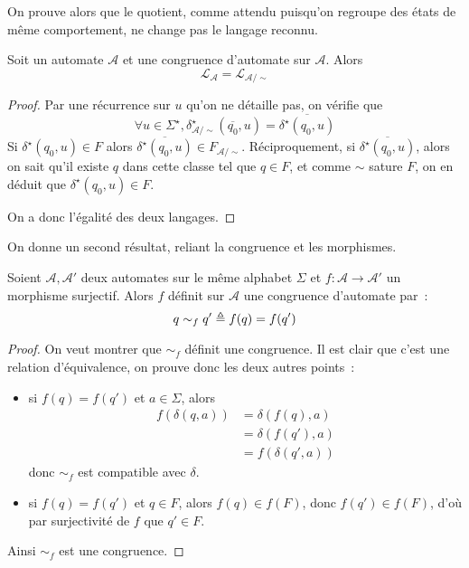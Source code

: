 On prouve alors que le quotient, comme attendu puisqu'on regroupe des états de
même comportement, ne change pas le langage reconnu.

\begin{proposition}
  Soit un automate $\mathcal A$ et une congruence d'automate sur $\mathcal A$.
  Alors
  \[\mathcal L_\mathcal A = \mathcal L_{\mathcal A/\sim}\]
\end{proposition}

\begin{proof}
  Par une récurrence sur $u$ qu'on ne détaille pas, on vérifie que
  \[\forall u \in \Sigma^\star,
  \delta^\star_{\mathcal A/\sim}(\overline{q_0},u)=
  \overline{\delta^\star(q_0,u)}\]
  Si $\delta^\star(q_0,u) \in F$ alors
  $\overline{\delta^\star(q_0,u)} \in F_{\mathcal A/\sim}$.
  Réciproquement, si $\overline{\delta^\star(q_0,u)}$, alors on sait qu'il
  existe $q$ dans cette classe tel que $q \in F$, et comme $\sim$ sature $F$,
  on en déduit que $\delta^\star(q_0,u) \in F$.

  On a donc l'égalité des deux langages.
\end{proof}

On donne un second résultat, reliant la congruence et les morphismes.

\begin{proposition}
  Soient $\mathcal A, \mathcal A'$ deux automates sur le même alphabet $\Sigma$
  et $f : \mathcal A \to \mathcal A'$ un morphisme surjectif. Alors $f$ définit
  sur $\mathcal A$ une congruence d'automate par~:
  \[q\sim_f q' \triangleq f(q) = f(q')\]
\end{proposition}

\begin{proof}
  On veut montrer que $\sim_f$ définit une congruence. Il est clair que c'est
  une relation d'équivalence, on prouve donc les deux autres points~:
  \begin{itemize}
  \item si $f(q) = f(q')$ et $a \in \Sigma$, alors
    \begin{align*}
      f(\delta(q,a)) &= \delta(f(q),a)\\
      &= \delta(f(q'),a)\\
      &= f(\delta(q',a))
    \end{align*}
    donc $\sim_f$ est compatible avec $\delta$.
  \item si $f(q) = f(q')$ et $q \in F$, alors $f(q) \in f(F)$, donc
    $f(q') \in f(F)$, d'où par surjectivité de $f$ que $q' \in F$.
  \end{itemize}
  Ainsi $\sim_f$ est une congruence.
\end{proof}

